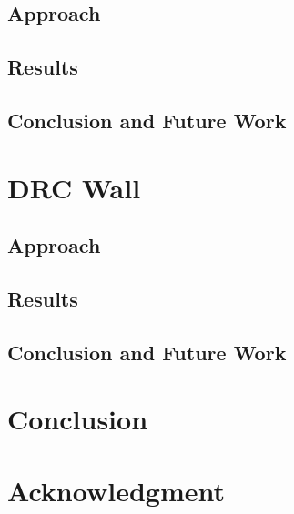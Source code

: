 \documentclass{article}
\begin{document}
\subsection{Approach}
\subsection{Results}
\subsection{Conclusion and Future Work}

\section{DRC Wall}
\subsection{Approach}
\subsection{Results}
\subsection{Conclusion and Future Work}

\section{Conclusion}

\section{Acknowledgment}








\end{document}
